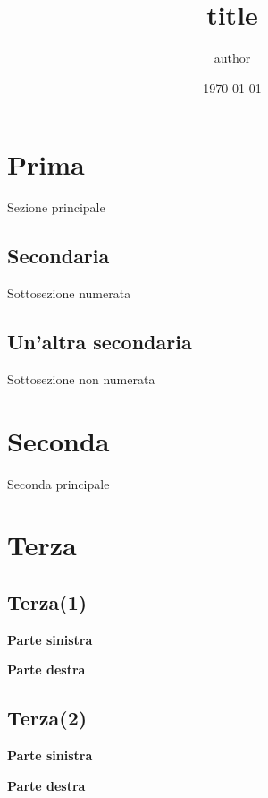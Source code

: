 \documentclass{article}
\title{title}
\author{author}
\date{\today}
\begin{document}
	
	\maketitle
	\tableofcontents
	
	\section{Prima}
	Sezione principale 
	\subsection{Secondaria} 
	Sottosezione numerata 
	\subsection*{Un'altra secondaria} 
	Sottosezione non numerata 
	\section{Seconda}
	Seconda principale
	
	\clearpage
	
	\section*{Terza}
	\subsection*{Terza(1)}
	\begin{minipage}{.5\linewidth}
		\flushleft
		\textbf{Parte sinistra}\\
		\lipsum[66]
	\end{minipage}
	\begin{minipage}{.5\linewidth}
		\flushright
		\textbf{Parte destra}\\
		\lipsum[66]
	\end{minipage}
	
	\subsection*{Terza(2)}
	\begin{minipage}{.33\linewidth}
		\flushleft
		\textbf{Parte sinistra}\\
		\lipsum[66]
	\end{minipage}
	\begin{minipage}{.33\linewidth}
		\flushright
		\textbf{Parte destra}\\
		\lipsum[66]
	\end{minipage}
	
\end{document}
